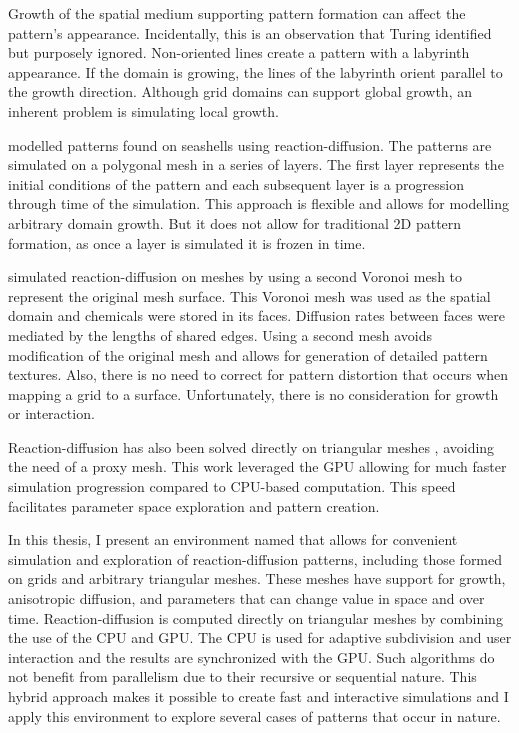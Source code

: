 Growth of the spatial medium supporting pattern formation can affect the pattern's appearance. Incidentally, this is an observation that Turing identified but purposely ignored. Non-oriented lines create a pattern with a labyrinth appearance. If the domain is growing, the lines of the labyrinth orient parallel to the growth direction. Although grid domains can support global growth, an inherent problem is simulating local growth. 

\citet{fowler1992} modelled patterns found on seashells using reaction-diffusion. The patterns are simulated on a polygonal mesh in a series of layers. The first layer represents the initial conditions of the pattern and each subsequent layer is a progression through time of the simulation. This approach is flexible and allows for modelling arbitrary domain growth. But it does not allow for traditional 2D pattern formation, as once a layer is simulated it is frozen in time.

\citet{turk1991} simulated reaction-diffusion on meshes by using a second Voronoi mesh to represent the original mesh surface. This Voronoi mesh was used as the spatial domain and chemicals were stored in its faces. Diffusion rates between faces were mediated by the lengths of shared edges. Using a second mesh avoids modification of the original mesh and allows for generation of detailed pattern textures. Also, there is no need to correct for pattern distortion that occurs when mapping a grid to a surface. Unfortunately, there is no consideration for growth or interaction. %

Reaction-diffusion has also been solved directly on triangular meshes \citep{descombes2016}, avoiding the need of a proxy mesh. This work leveraged the GPU allowing for much faster simulation progression compared to CPU-based computation. This speed facilitates parameter space exploration and pattern creation. 

In this thesis, I present an environment named \ProgramName{} that allows for convenient simulation and exploration of reaction-diffusion patterns, including those formed on grids and arbitrary triangular meshes. These meshes have support for growth, anisotropic diffusion, and parameters that can change value in space and over time. Reaction-diffusion is computed directly on triangular meshes by combining the use of the CPU and GPU. The CPU is used for adaptive subdivision and user interaction and the results are synchronized with the GPU. Such algorithms do not benefit from parallelism due to their recursive or sequential nature. This hybrid approach makes it possible to create fast and interactive simulations and I apply this environment to explore several cases of patterns that occur in nature.

